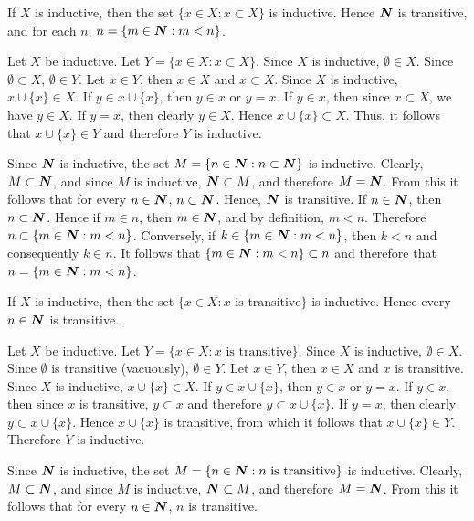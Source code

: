  If $X$ is inductive, then the set
$\{ x \in X : x \subset X \}$ is inductive. Hence $\boldsymbol{N}$ is
transitive, and for each $n$, $n = \{ m \in \boldsymbol{N} : m < n \}$.
\begin{solution}
  Let $X$ be inductive. Let $Y = \{ x \in X : x \subset X \}$.
  Since $X$ is inductive, $\emptyset \in X$. Since 
  $\emptyset \subset X$, $\emptyset \in Y$. Let $x \in Y$, then
  $x \in X$ and $x \subset X$. Since $X$ is inductive, 
  $x \cup \{ x \} \in X$. If $y \in x \cup \{ x \}$, then 
  $y \in x$ or $y = x$. If $y \in x$, then since $x \subset X$,
  we have $y \in X$. If $y = x$, then clearly $y \in X$. Hence 
  $x \cup \{ x \} \subset X$. Thus, it follows that 
  $x \cup \{ x \} \in Y$ and therefore $Y$ is inductive.
  
  Since $\boldsymbol{N}$ is inductive, the set 
  $M = \{ n \in \boldsymbol{N} : n \subset \boldsymbol{N} \}$ is inductive. Clearly, 
  $M \subset \boldsymbol{N}$, and since $M$ is inductive, $\boldsymbol{N} \subset M$, 
  and therefore $M = \boldsymbol{N}$. From this it follows that for every 
  $n \in \boldsymbol{N}$, $n \subset \boldsymbol{N}$. Hence, $\boldsymbol{N}$ is transitive. If 
  $n \in \boldsymbol{N}$, then $n \subset \boldsymbol{N}$. Hence if $m \in n$, then 
  $m \in \boldsymbol{N}$, and by definition, $m < n$. Therefore 
  $n \subset \{ m \in \boldsymbol{N} : m < n \}$. Conversely, if 
  $k \in \{ m \in \boldsymbol{N} : m < n \}$, then $k < n$ and consequently
  $k \in n$. It follows that $\{ m \in \boldsymbol{N} : m < n \} \subset n$
  and therefore that $n = \{ m \in \boldsymbol{N} : m < n \}$.
\end{solution}

 If $X$ is inductive, then the set 
$\{ x \in X : x \text{ is transitive} \}$ is inductive. Hence
every $n \in \boldsymbol{N}$ is transitive.
\begin{solution}
  Let $X$ be inductive. Let $Y = \{ x \in X : x \text{ is
  transitive} \}$. Since $X$ is inductive, $\emptyset \in X$.
  Since $\emptyset$ is transitive (vacuously), 
  $\emptyset \in Y$. Let $x \in Y$, then $x \in X$ and $x$ is
  transitive. Since $X$ is inductive, $x \cup \{ x \} \in X$.
  If $y \in x \cup \{ x \}$, then $y \in x$ or $y = x$. If
  $y \in x$, then since $x$ is transitive, $y \subset x$ and
  therefore $y \subset x \cup \{ x \}$. If $y = x$, then
  clearly $ y \subset x \cup \{ x \}$. Hence
  $x \cup \{ x \}$ is transitive, from which it follows that
  $x \cup \{ x \} \in Y$. Therefore $Y$ is inductive.

  Since $\boldsymbol{N}$ is inductive, the set 
  $M = \{ n \in \boldsymbol{N} : n \text{ is transitive} \}$ is inductive.
  Clearly, $M \subset \boldsymbol{N}$, and since $M$ is inductive,
  $\boldsymbol{N} \subset M$, and therefore $M = \boldsymbol{N}$. From this it follows
  that for every $n \in \boldsymbol{N}$, $n$ is transitive.
\end{solution}

